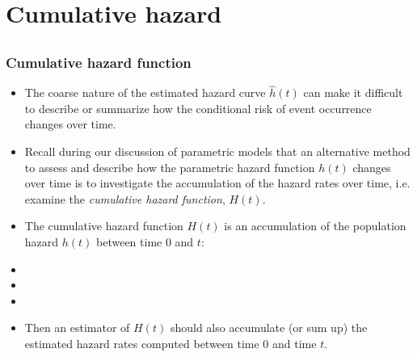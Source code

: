 \section[Cumulative hazard]{Cumulative hazard}
\subsection{}
\begin{frame}
\end{frame}

\begin{frame}
\frametitle{Cumulative hazard function}
\begin{itemize}
\item The coarse nature of the estimated hazard curve $\hat{h}(t)$ can make it difficult to
describe or summarize how the conditional risk of event occurrence changes over time.

\item Recall during our discussion of parametric models that an alternative method to assess and describe how the
parametric hazard function $h(t)$ changes over time is to investigate the accumulation of the hazard rates over time,
i.e. examine the \textit{cumulative hazard function}, $H(t)$.

\item The cumulative hazard function $H(t)$ is an accumulation of the population hazard $h(t)$ between time 0 and $t$:
\item[]
\item[]
\item[]

\item Then an estimator of $H(t)$ should also accumulate (or sum up)
the estimated hazard rates computed between time 0 and time $t$.

\end{itemize}
\end{frame}


